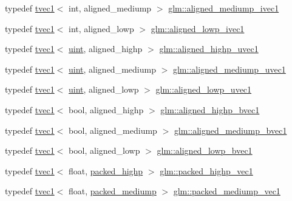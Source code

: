 \begin{DoxyCompactItemize}
typedef \mbox{\hyperlink{structglm_1_1tvec1}{tvec1}}$<$ int, aligned\+\_\+mediump $>$ \mbox{\hyperlink{group__gtc__type__aligned_gaecd25bdc3dfe93926b540eff3a8a2e5c}{glm\+::aligned\+\_\+mediump\+\_\+ivec1}}
\item 
typedef \mbox{\hyperlink{structglm_1_1tvec1}{tvec1}}$<$ int, aligned\+\_\+lowp $>$ \mbox{\hyperlink{group__gtc__type__aligned_ga3688074e5264a94d6671a6218fd2e6a4}{glm\+::aligned\+\_\+lowp\+\_\+ivec1}}
\item 
typedef \mbox{\hyperlink{structglm_1_1tvec1}{tvec1}}$<$ \mbox{\hyperlink{group__core__precision_ga4fd29415871152bfb5abd588334147c8}{uint}}, aligned\+\_\+highp $>$ \mbox{\hyperlink{group__gtc__type__aligned_ga14fec93434c0b98ff5318e49a1ae9185}{glm\+::aligned\+\_\+highp\+\_\+uvec1}}
\item 
typedef \mbox{\hyperlink{structglm_1_1tvec1}{tvec1}}$<$ \mbox{\hyperlink{group__core__precision_ga4fd29415871152bfb5abd588334147c8}{uint}}, aligned\+\_\+mediump $>$ \mbox{\hyperlink{group__gtc__type__aligned_gaacb67fc981364f5615b4235ed56e1be2}{glm\+::aligned\+\_\+mediump\+\_\+uvec1}}
\item 
typedef \mbox{\hyperlink{structglm_1_1tvec1}{tvec1}}$<$ \mbox{\hyperlink{group__core__precision_ga4fd29415871152bfb5abd588334147c8}{uint}}, aligned\+\_\+lowp $>$ \mbox{\hyperlink{group__gtc__type__aligned_gab370245153f6b995068aac82bfb31ed6}{glm\+::aligned\+\_\+lowp\+\_\+uvec1}}
\item 
typedef \mbox{\hyperlink{structglm_1_1tvec1}{tvec1}}$<$ bool, aligned\+\_\+highp $>$ \mbox{\hyperlink{group__gtc__type__aligned_ga3e78791d8be2a1766bc7bc9d666f0f7f}{glm\+::aligned\+\_\+highp\+\_\+bvec1}}
\item 
typedef \mbox{\hyperlink{structglm_1_1tvec1}{tvec1}}$<$ bool, aligned\+\_\+mediump $>$ \mbox{\hyperlink{group__gtc__type__aligned_gaaafb3137651696c59dd359c891338dff}{glm\+::aligned\+\_\+mediump\+\_\+bvec1}}
\item 
typedef \mbox{\hyperlink{structglm_1_1tvec1}{tvec1}}$<$ bool, aligned\+\_\+lowp $>$ \mbox{\hyperlink{group__gtc__type__aligned_ga14a75d34e21dea21ebc963dbb7596a02}{glm\+::aligned\+\_\+lowp\+\_\+bvec1}}
\item 
typedef \mbox{\hyperlink{structglm_1_1tvec1}{tvec1}}$<$ float, \mbox{\hyperlink{namespaceglm_a0f04f086094c747d227af4425893f545a8e8791ee77fe079b1291f710d88031bf}{packed\+\_\+highp}} $>$ \mbox{\hyperlink{group__gtc__type__aligned_ga8514bab94f23d24c7655949bb44797a6}{glm\+::packed\+\_\+highp\+\_\+vec1}}
\item 
typedef \mbox{\hyperlink{structglm_1_1tvec1}{tvec1}}$<$ float, \mbox{\hyperlink{namespaceglm_a0f04f086094c747d227af4425893f545a9604654c3b137cd7898689fd34b25bc0}{packed\+\_\+mediump}} $>$ \mbox{\hyperlink{group__gtc__type__aligned_ga8925347b8c400ad16e18e6e46110002a}{glm\+::packed\+\_\+mediump\+\_\+vec1}}

\end{DoxyCompactItemize}
